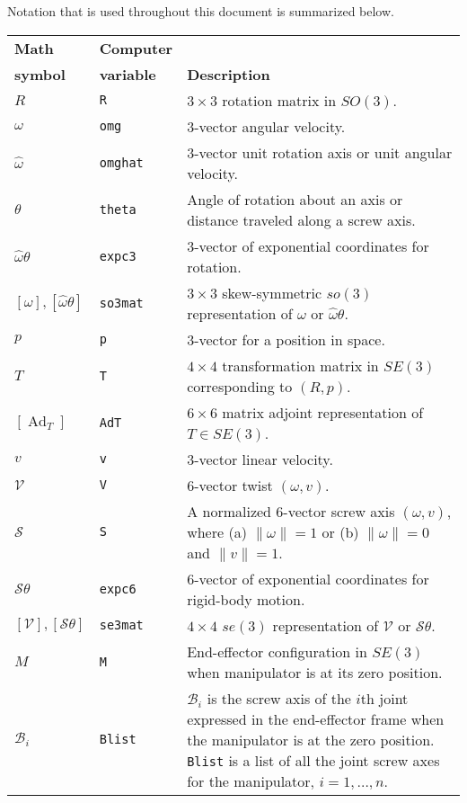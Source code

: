 \documentclass[11pt]{article}
\begin{document}
Notation that is used throughout this document is summarized below.

\begin{tabularx}{\linewidth}{llp{4.5in}}
\toprule
{\bf Math} & {\bf Computer} & \\
{\bf symbol} & {\bf variable} & {\bf Description} \\
\midrule
$R$ & {\tt R} & $3 \times 3$ rotation matrix in $SO(3)$. \\
$\omega$ & {\tt omg} & $3$-vector angular velocity. \\
$\hat{\omega}$ & {\tt omghat} & $3$-vector unit rotation axis or unit angular velocity. \\
$\theta$ & {\tt theta} & Angle of rotation about an axis or distance traveled along a screw axis. \\
$\hat{\omega} \theta$ & {\tt expc3} & $3$-vector of exponential coordinates for rotation. \\
$[\omega], [\hat{\omega} \theta] $ & {\tt so3mat} & $3 \times 3$ skew-symmetric $so(3)$ representation of $\omega$ or $\hat{\omega} \theta$. \\
$p$ & {\tt p} & $3$-vector for a position in space. \\
$T$ & {\tt T} & $4 \times 4$ transformation matrix in $SE(3)$ corresponding to $(R,p)$. \\
$[\operatorname{Ad}_T]$ & {\tt AdT} & $6 \times 6$ matrix adjoint representation of $T \in SE(3)$. \\
$v$ & {\tt v} & $3$-vector linear velocity. \\
$\mathcal{V}$ & {\tt V} & $6$-vector twist $(\omega, v)$. \\
$\mathcal{S}$ & {\tt S} & A normalized $6$-vector screw axis $(\omega,v)$, where (a) $\|\omega\| = 1$ or (b) $\|\omega\| = 0$ and $\|v\| = 1$. \\
$\mathcal{S}\theta$ & {\tt expc6} & $6$-vector of exponential coordinates for rigid-body motion. \\
$[\mathcal{V}], [\mathcal{S} \theta]$ & {\tt se3mat} & $4 \times 4$ $se(3)$ representation of $\mathcal{V}$ or $\mathcal{S} \theta$. \\
$M$ & {\tt M} & End-effector configuration in $SE(3)$ when manipulator is at its zero position. \\
$\mathcal{B}_i$ & {\tt Blist} & $\mathcal{B}_i$ is the screw axis of the $i$th joint expressed in the end-effector frame when the manipulator is at the zero position.  {\tt Blist} is a list of all the joint screw axes for the manipulator, $i = 1, \ldots, n$. \\

\end{tabularx}
\end{document}

